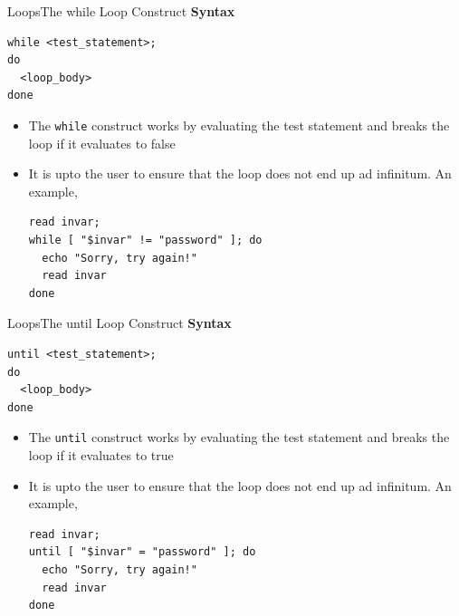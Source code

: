 \documentclass{beamer}
\begin{document}
\begin{frame}[fragile]{Loops}{The while Loop Construct}
  \textbf{Syntax}\\
\begin{verbatim}
while <test_statement>;
do
  <loop_body>
done
\end{verbatim}
  \begin{itemize}
  \item The \verb|while| construct works by evaluating the test
    statement and breaks the loop if it evaluates to false
  \item It is upto the user to ensure that the loop does not end up ad
    infinitum. An example,
\begin{verbatim}
read invar;
while [ "$invar" != "password" ]; do
  echo "Sorry, try again!"
  read invar
done
\end{verbatim}
  \end{itemize}
\end{frame}

\begin{frame}[fragile]{Loops}{The until Loop Construct}
  \textbf{Syntax}\\
\begin{verbatim}
until <test_statement>;
do
  <loop_body>
done
\end{verbatim}
  \begin{itemize}
  \item The \verb|until| construct works by evaluating the test
    statement and breaks the loop if it evaluates to true
  \item It is upto the user to ensure that the loop does not end up ad
    infinitum. An example,
\begin{verbatim}
read invar;
until [ "$invar" = "password" ]; do
  echo "Sorry, try again!"
  read invar
done
\end{verbatim}
  \end{itemize}
\end{frame}
\end{document}
